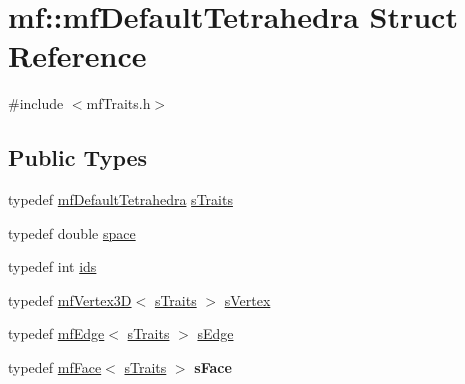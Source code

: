 \hypertarget{structmf_1_1mfDefaultTetrahedra}{
\section{mf::mfDefaultTetrahedra Struct Reference}
\label{structmf_1_1mfDefaultTetrahedra}
}


{\ttfamily \#include $<$mfTraits.h$>$}

\subsection*{Public Types}
\begin{DoxyCompactItemize}
\item 
typedef \hyperlink{structmf_1_1mfDefaultTetrahedra}{mfDefaultTetrahedra} \hyperlink{structmf_1_1mfDefaultTetrahedra_aa7c2b6abf2d636386076db5148ddab07}{sTraits}
\item 
typedef double \hyperlink{structmf_1_1mfDefaultTetrahedra_a4e34de315ce8a970390a6e2483f5698b}{space}
\item 
typedef int \hyperlink{structmf_1_1mfDefaultTetrahedra_a4343b74f9ba16bcb6e80a1a960d9b3cd}{ids}
\item 
typedef \hyperlink{classmf_1_1mfVertex3D}{mfVertex3D}$<$ \hyperlink{structmf_1_1mfDefaultTetrahedra}{sTraits} $>$ \hyperlink{structmf_1_1mfDefaultTetrahedra_a50d9db7b43fac8d266524b43e72240fb}{sVertex}
\item 
typedef \hyperlink{classmf_1_1mfEdge}{mfEdge}$<$ \hyperlink{structmf_1_1mfDefaultTetrahedra}{sTraits} $>$ \hyperlink{structmf_1_1mfDefaultTetrahedra_a118dd6dbb6a4e47f3c8dd14a85af9970}{sEdge}
\item 
\hypertarget{structmf_1_1mfDefaultTetrahedra_a071879241e6edbfdbc4c7bbe19bbd336}{
typedef \hyperlink{classmf_1_1mfFace}{mfFace}$<$ \hyperlink{structmf_1_1mfDefaultTetrahedra}{sTraits} $>$ {\bfseries sFace}}
\label{structmf_1_1mfDefaultTetrahedra_a071879241e6edbfdbc4c7bbe19bbd336}


\end{DoxyCompactItemize}
